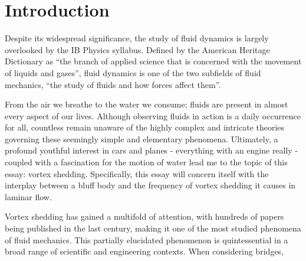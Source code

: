 \section*{Introduction}
Despite its widespread significance, the study of fluid dynamics is largely overlooked by the IB Physics syllabus. Defined by the American Heritage Dictionary as “the branch of applied science that is concerned with the movement of liquids and gases”, fluid dynamics is one of the two subfields of fluid mechanics, “the study of fluids and how forces affect them”. 

From the air we breathe to the water we consume; fluids are present in almost every aspect of our lives. Although observing fluids in action is a daily occurrence for all, countless remain unaware of the highly complex and intricate theories governing these seemingly simple and elementary phenomena. Ultimately, a profound youthful interest in cars and planes - everything with an engine really - coupled with a fascination for the motion of water lead me to the topic of this essay: vortex shedding. Specifically, this essay will concern itself with the interplay between a bluff body and the frequency of vortex shedding it causes in laminar flow. 

Vortex shedding has gained a multifold of attention, with hundreds of papers being published in the last century, making it one of the most studied phenomena of fluid mechanics. This partially elucidated phenomenon is quintessential in a broad range of scientific and engineering contexts. When considering bridges,